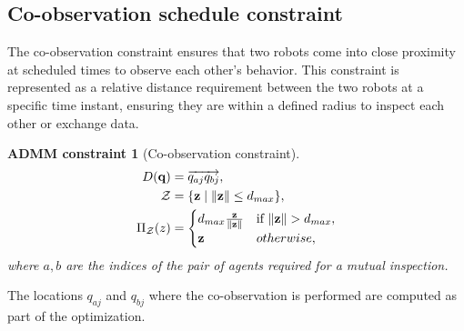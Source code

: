 \documentclass[journal]{IEEEtran}  %
\newtheorem{constraint}{ADMM constraint}
\def\sZ{\mathcal{Z}}
\begin{document}
\subsection{Co-observation schedule constraint}\label{sec:co-observation-constraint}
The co-observation constraint ensures that two robots come into close proximity at scheduled times to observe each other's behavior. This constraint is represented as a relative distance requirement between the two robots at a specific time instant, ensuring they are within a defined radius to inspect each other or exchange data. %


\begin{constraint}[Co-observation constraint]\label{constraint:coobservation}
\begin{align}
D(\vq) &= \overrightarrow{q_{aj}q_{bj}}, \label{eq:coobservation_constraint}\\
  \sZ &= \{\vz \mid \norm{\vz} \leq d_{max} \},\\
   \Pi_\sZ(z) & = \begin{cases}
d_{max}\frac{\vz}{\norm{\vz}} &\text{if } \norm{\vz} > d_{max},\\
\vz	& otherwise,
\end{cases}
\end{align}
where $a,b$ are the indices of the pair of agents required for a mutual inspection.
\end{constraint}

 The locations $q_{aj}$ and $q_{bj}$ where the co-observation is performed are computed as part of the optimization.
\end{document}
